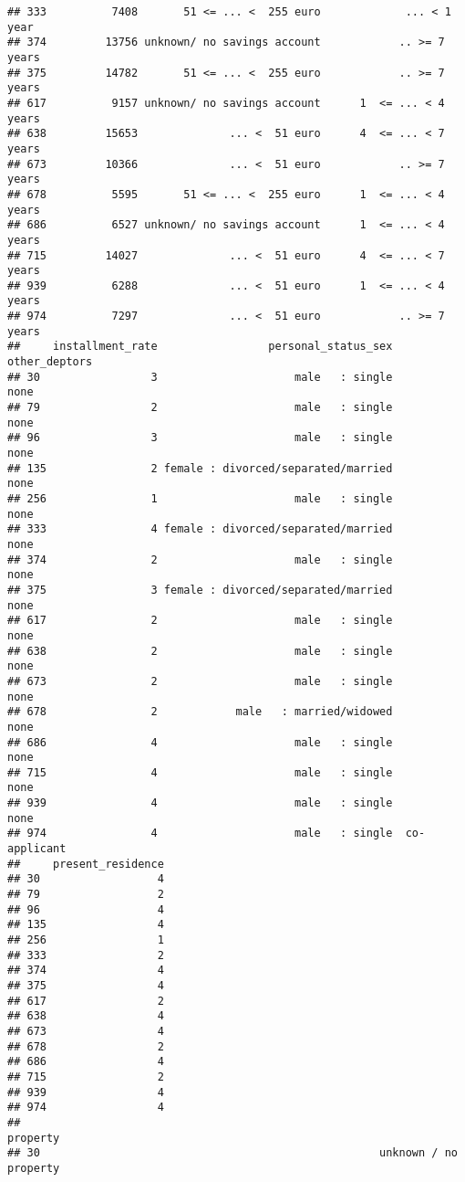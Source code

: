 \documentclass[
]{article}
\begin{document}
\begin{verbatim}
## 333          7408       51 <= ... <  255 euro             ... < 1 year
## 374         13756 unknown/ no savings account            .. >= 7 years
## 375         14782       51 <= ... <  255 euro            .. >= 7 years
## 617          9157 unknown/ no savings account      1  <= ... < 4 years
## 638         15653              ... <  51 euro      4  <= ... < 7 years
## 673         10366              ... <  51 euro            .. >= 7 years
## 678          5595       51 <= ... <  255 euro      1  <= ... < 4 years
## 686          6527 unknown/ no savings account      1  <= ... < 4 years
## 715         14027              ... <  51 euro      4  <= ... < 7 years
## 939          6288              ... <  51 euro      1  <= ... < 4 years
## 974          7297              ... <  51 euro            .. >= 7 years
##     installment_rate                 personal_status_sex other_deptors
## 30                 3                     male   : single          none
## 79                 2                     male   : single          none
## 96                 3                     male   : single          none
## 135                2 female : divorced/separated/married          none
## 256                1                     male   : single          none
## 333                4 female : divorced/separated/married          none
## 374                2                     male   : single          none
## 375                3 female : divorced/separated/married          none
## 617                2                     male   : single          none
## 638                2                     male   : single          none
## 673                2                     male   : single          none
## 678                2            male   : married/widowed          none
## 686                4                     male   : single          none
## 715                4                     male   : single          none
## 939                4                     male   : single          none
## 974                4                     male   : single  co-applicant
##     present_residence
## 30                  4
## 79                  2
## 96                  4
## 135                 4
## 256                 1
## 333                 2
## 374                 4
## 375                 4
## 617                 2
## 638                 4
## 673                 4
## 678                 2
## 686                 4
## 715                 2
## 939                 4
## 974                 4
##                                                                    property
## 30                                                    unknown / no property

\end{verbatim}
\end{document}
